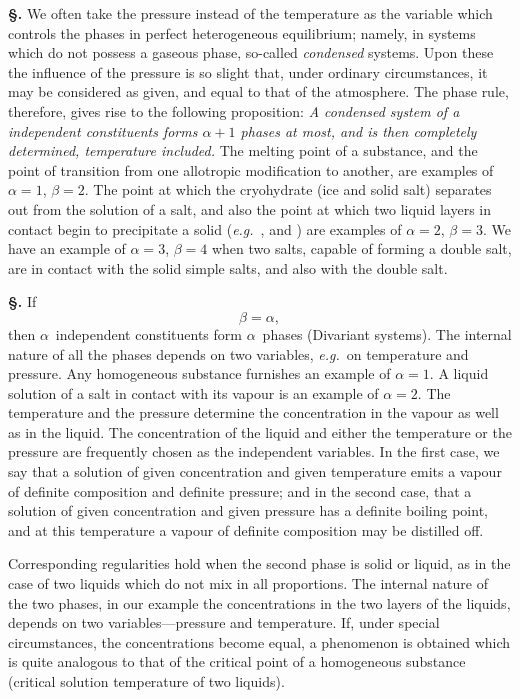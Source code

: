 \documentclass[12pt]{book}[2005/09/16]
\newcommand{\Section}[1]{
  \medskip\par\textbf{§\;#1}
  \label{section:#1}
}
\newcommand{\PageSep}[1]{\ignorespaces}
\newcommand{\eg}{\emph{e.g.}}
\begin{document}
\Section{207.} We often take the pressure instead of the temperature
as the variable which controls the phases in
perfect heterogeneous equilibrium; namely, in systems
which do not possess a gaseous phase, so-called \emph{condensed}
systems. Upon these the influence of the pressure is so
slight that, under ordinary circumstances, it may be considered
as given, and equal to that of the atmosphere. The
phase rule, therefore, gives rise to the following proposition:
\emph{A condensed system of a independent constituents forms $\alpha + 1$
%
%
phases at most, and is then completely determined, temperature
included.} The melting point of a substance, and the point
of transition from one allotropic modification to another, are
examples of $\alpha = 1$, $\beta = 2$. The point at which the cryohydrate
(ice and solid salt) separates out from the solution of
a salt, and also the point at which two liquid layers in
contact begin to precipitate a solid (\eg\ , and )
are examples of $\alpha = 2$, $\beta = 3$. We have an example of
$\alpha = 3$, $\beta = 4$ when two salts, capable of forming a double
salt, are in contact with the solid simple salts, and also with
the double salt.

\Section{208.} If
%
%
\[
\beta = \alpha,
\]
then $\alpha$~independent constituents form $\alpha$~phases (Divariant
systems). The internal nature of all the phases depends
\PageSep{182}
on two variables, \eg\ on temperature and pressure. Any
%
homogeneous substance furnishes an example of $\alpha = 1$. A
liquid solution of a salt in contact with its vapour is an
example of $\alpha = 2$. The temperature and the pressure determine
the concentration in the vapour as well as in the liquid.
The concentration of the liquid and either the temperature
or the pressure are frequently chosen as the independent
variables. In the first case, we say that a solution of given
concentration and given temperature emits a vapour of
definite composition and definite pressure; and in the second
case, that a solution of given concentration and given pressure
has a definite boiling point, and at this temperature a vapour
of definite composition may be distilled off.

Corresponding regularities hold when the second phase
is solid or liquid, as in the case of two liquids which do not
mix in all proportions. The internal nature of the two
phases, in our example the concentrations in the two layers
of the liquids, depends on two variables---pressure and
temperature. If, under special circumstances, the concentrations
become equal, a phenomenon is obtained which
is quite analogous to that of the critical point of a homogeneous
%
substance (critical solution temperature of two
liquids).
\end{document}
